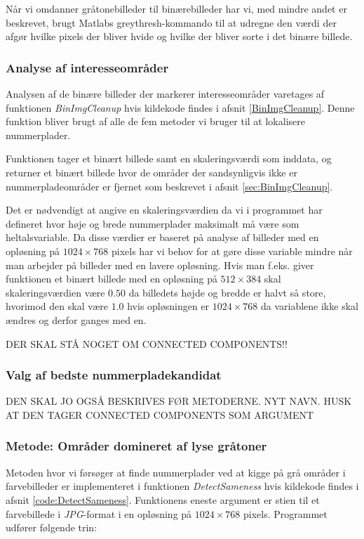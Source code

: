 Når vi omdanner gråtonebilleder til binærebilleder har vi, med mindre andet er beskrevet, brugt Matlabs greythresh-kommando til at udregne den værdi der afgør hvilke pixels der bliver hvide og hvilke der bliver sorte i det binære billede.

\subsubsection{Analyse af interesseområder}
\label{sec:imp:BinImgCleanup}
Analysen af de binære billeder der markerer interesseområder varetages af funktionen \textit{BinImgCleanup} hvis kildekode findes i afsnit \vref{BinImgCleanup}. Denne funktion bliver brugt af alle de fem metoder vi bruger til at lokalisere nummerplader.

Funktionen tager et binært billede samt en skaleringsværdi som inddata, og returner et binært billede hvor de områder der sandsynligvis ikke er nummerpladeområder er fjernet som beskrevet i afsnit \vref{sec:BinImgCleanup}.

Det er nødvendigt at angive en skaleringsværdien da vi i programmet har defineret hvor høje og brede nummerplader maksimalt må være som heltalsvariable. Da disse værdier er baseret på analyse af billeder med en opløsning på $1024 \times 768$ pixels har vi behov for at gøre disse variable mindre når man arbejder på billeder med en lavere opløsning. Hvis man f.eks. giver funktionen et binært billede med en opløsning på $512 \times 384$ skal skaleringsværdien være $0.50$ da billedets højde og bredde er halvt så store, hvorimod den skal være $1.0$ hvis opløsningen er $1024 \times 768$ da variablene ikke skal ændres og derfor ganges med en.

DER SKAL STÅ NOGET OM CONNECTED COMPONENTS!!

\subsubsection{Valg af bedste nummerpladekandidat}
\label{sec:imp:GetBestCandidate}
DEN SKAL JO OGSÅ BESKRIVES FØR METODERNE.
NYT NAVN.
HUSK AT DEN TAGER CONNECTED COMPONENTS SOM ARGUMENT

\subsubsection{Metode: Områder domineret af lyse gråtoner}
Metoden hvor vi førsøger at finde nummerplader ved at kigge på grå områder i farvebilleder er implementeret i funktionen \textit{DetectSameness} hvis kildekode findes i afsnit \vref{code:DetectSameness}. Funktionens eneste argument er stien til et farvebillede i \textit{JPG}-format i en opløsning på $1024 \times 768$ pixels. Programmet udfører følgende trin:

